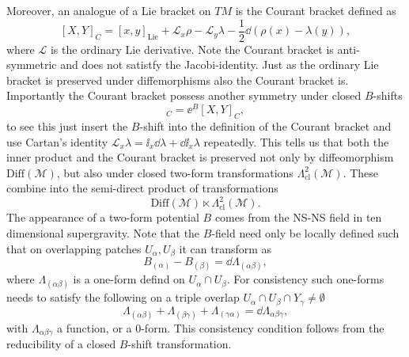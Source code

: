 Moreover, an analogue of a Lie bracket on $TM$ is the Courant bracket defined as 
\begin{equation}
    \left[X,Y\right]_C = [x,y]_{\text{Lie}}+\mathcal{L}_x\rho-\mathcal{L}_y\lambda -\frac{1}{2}\dd\left(\rho(x)-\lambda(y)\right),
\end{equation}
where $\mathcal{L}$ is the ordinary Lie derivative. Note the Courant bracket is anti-symmetric and does not satistfy the Jacobi-identity.  Just as the ordinary Lie bracket is preserved under diffemorphisms also the Courant bracket is. Importantly the Courant bracket possess another symmetry under closed $B$-shifts 
\begin{equation}
    [\ee^BX,\ee^BY]_C = \ee^B[X,Y]_C,
\end{equation}
to see this just insert the $B$-shift into the definition of the Courant bracket and use Cartan's identity $\mathcal{L}_x\lambda = \ii_x\dd\lambda+\dd\ii_x\lambda$ repeatedly. This tells us that both the inner product and the Courant bracket is preserved not only by diffeomorphism $\text{Diff}(\mathcal{M})$, but also under closed two-form transformations $\Lambda^2_{\text{cl}}(\mathcal{M})$. These combine into the semi-direct product of transformations 
\begin{equation}
    \text{Diff}(\mathcal{M})\ltimes\Lambda^2_{\text{cl}}(\mathcal{M}).
\end{equation}
The appearance of a two-form potential $B$ comes from the NS-NS field in ten dimensional supergravity. Note that the $B$-field need only be locally defined such that on overlapping patches $U_\alpha,U_\beta$ it can transform as 
\begin{equation}
   B_{(\alpha)}-B_{(\beta)} = \dd \Lambda_{(\alpha\beta)},
\end{equation}
where $\Lambda_{(\alpha\beta)}$ is a one-form defind on $U_\alpha\cap U_\beta$. For consistency such one-forms needs to satisfy the following on a triple overlap $U_\alpha\cap U_\beta\cap Y_\gamma\neq\emptyset$
\begin{equation}
    \Lambda_{(\alpha\beta)}+\Lambda_{(\beta\gamma)}+\Lambda_{(\gamma\alpha)} =\dd \Lambda_{\alpha\beta\gamma},
\end{equation}
with $\Lambda_{\alpha\beta\gamma}$ a function, or a $0$-form. This consistency condition follows from the reducibility of a closed $B$-shift transformation. 

